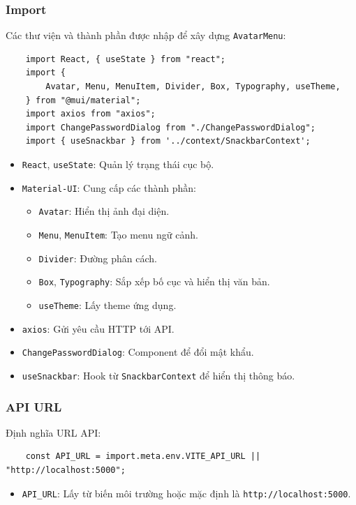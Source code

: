             \subsubsection{Import}
                \hspace*{0.6cm}Các thư viện và thành phần được nhập để xây dựng \texttt{AvatarMenu}:
                \begin{lstlisting}
    import React, { useState } from "react";
    import {
        Avatar, Menu, MenuItem, Divider, Box, Typography, useTheme,
    } from "@mui/material";
    import axios from "axios";
    import ChangePasswordDialog from "./ChangePasswordDialog";
    import { useSnackbar } from '../context/SnackbarContext';
                \end{lstlisting}
                \begin{itemize}
                    \item \texttt{React}, \texttt{useState}: Quản lý trạng thái cục bộ.
                    \item \texttt{Material-UI}: Cung cấp các thành phần:
                    \begin{itemize}
                        \item \texttt{Avatar}: Hiển thị ảnh đại diện.
                        \item \texttt{Menu}, \texttt{MenuItem}: Tạo menu ngữ cảnh.
                        \item \texttt{Divider}: Đường phân cách.
                        \item \texttt{Box}, \texttt{Typography}: Sắp xếp bố cục và hiển thị văn bản.
                        \item \texttt{useTheme}: Lấy theme ứng dụng.
                    \end{itemize}
                    \item \texttt{axios}: Gửi yêu cầu HTTP tới API.
                    \item \texttt{ChangePasswordDialog}: Component để đổi mật khẩu.
                    \item \texttt{useSnackbar}: Hook từ \texttt{SnackbarContext} để hiển thị thông báo.
                \end{itemize}

            \subsubsection{API URL}
                \hspace*{0.6cm}Định nghĩa URL API:
                \begin{lstlisting}
    const API_URL = import.meta.env.VITE_API_URL || "http://localhost:5000";
                \end{lstlisting}
                \begin{itemize}
                    \item \texttt{API\_URL}: Lấy từ biến môi trường hoặc mặc định là \texttt{http://localhost:5000}.
                \end{itemize}

